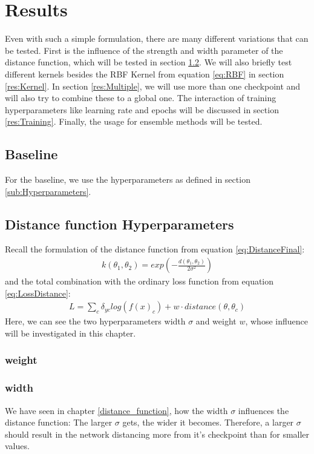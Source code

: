 \chapter{Results}
Even with such a simple formulation, there are many different variations that
can be tested. First is the influence of the strength and width parameter of the
distance function, which will be tested in section \ref{res:Hyperparameters}. We
will also briefly test different kernels besides the RBF Kernel from equation
\ref{eq:RBF} in section \ref{res:Kernel}. In section \ref{res:Multiple}, we will
use more than one checkpoint and will also try to combine these to a global one.
The interaction of training hyperparameters like learning rate and epochs will
be discussed in section \ref{res:Training}. Finally, the usage for ensemble
methods will be tested.

\section{Baseline}
For the baseline, we use the hyperparameters as defined in section
\ref{sub:Hyperparameters}. 

\section{Distance function Hyperparameters}\label{res:Hyperparameters}
Recall the formulation of the distance function from equation
\ref{eq:DistanceFinal}:
\begin{align}
    k(\theta_1, \theta_2)=exp(-\frac{d(\theta_1, \theta_2)}{2\sigma^2})
\end{align}
and the total combination with the ordinary loss function from equation
\ref{eq:LossDistance}:
\begin{align}
    L=\sum_{c} \delta_{yc} log(f(x)_c) + w \cdot distance(\theta, \theta_c)
\end{align}
Here, we can see the two hyperparameters width $\sigma$ and weight $w$, whose
influence will be investigated in this chapter.
\subsection{weight}

\subsection{width}
We have seen in chapter \ref{distance_function}, how the width $\sigma$
influences the distance function: The larger $\sigma$ gets, the wider it
becomes. Therefore, a larger $\sigma$ should result in the network distancing
more from it's checkpoint than for smaller values.



